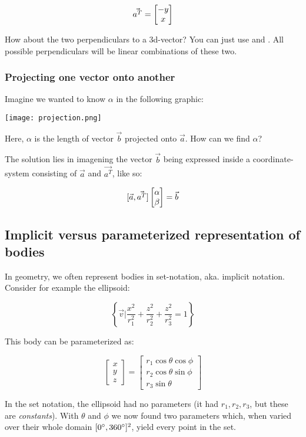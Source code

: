 $$ \vec{a^T} =  \begin{bmatrix}  -y \\ x  \\ \end{bmatrix}  $$


How about the two perpendiculars to a 3d-vector? You can just use  and . All possible perpendiculars will be linear combinations of these two.


\subsubsection{Projecting one vector onto another}

Imagine we wanted to know $\alpha$ in the following graphic:

\texttt{[image: projection.png]}

Here, $\alpha$ is the length of vector $\vec{b}$ projected onto $\vec{a}$. How can we find $\alpha$?

The solution lies in imagening the vector $\vec{b}$ being expressed inside a coordinate-system consisting of $\vec{a}$ and $\vec{a^T}$, like so: 

$$ [ \vec{a}, \vec{a^T} ]  \begin{bmatrix}  \alpha \\ \beta  \\ \end{bmatrix}  = \vec{b} $$



\subsection{Implicit versus parameterized representation of bodies}

In geometry, we often represent bodies in set-notation, aka. implicit notation. Consider for example the ellipsoid: 

$$ \left \{\vec{v} | \frac{x^2}{r_1^2} + \frac{z^2}{r_2^2} + \frac{z^2}{r_3^2} = 1 \right \}$$

This body can be parameterized as: 

$$ \begin{bmatrix}
x \\
y \\
z
\end{bmatrix} = 
\begin{bmatrix}
r_1 \cos{\theta} \cos{\phi} \\
r_2 \cos{\theta} \sin{\phi} \\
r_3 \sin{\theta}
\end{bmatrix} $$

In the set notation, the ellipsoid had no parameters (it had $r_1, r_2, r_3$, but these are \emph{constants}). With $\theta$ and $\phi$ we now found two parameters which, when varied over their whole domain $[0\degree, 360\degree]^2$, yield every point in the set. 


